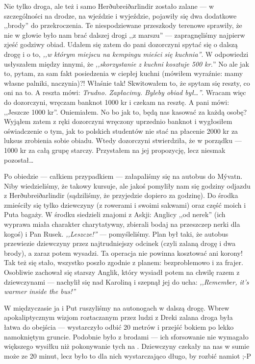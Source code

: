 Nie tylko droga, ale też i samo Herðubreiðarlindir zostało zalane --- w szczególności na drodze, na wjeździe i wyjeździe, pojawiły się dwa dodatkowe ,,brody'' do przekroczenia. Te niespodziewane przeszkody terenowe sprawiły, że nie w głowie było nam brać dalszej drogi ,,z marszu'' --- zapragnęliśmy najpierw zjeść godziwy obiad. Udałem się zatem do pani dozorczyni spytać się o dalszą drogę i o to, \emph{,,w którym miejscu na kempingu mieści się kuchnia''}. W odpowiedzi usłyszałem między innymi, że \emph{,,skorzystanie z kuchni kosztuje 500 kr.}'' No ale jak to, pytam, za sam fakt posiedzenia w ciepłej kuchni (mówiłem wyraźnie: mamy własne palniki, naczynia)?! Właśnie tak! Skwitowałem to, że spytam się reszty, co oni na to. A reszta mówi: \emph{Trudno. Zapłacimy. Byleby obiad był…''}. Wracam więc do dozorczyni, wręczam banknot 1000 kr i czekam na resztę. A pani mówi: ,,Jeszcze 1000 kr''. Oniemiałem. No bo jak to, będą nas kasować za każdą osobę? Wyjąłem zatem z ręki dozorczyni wręczony uprzednio banknot i wygłosiłem oświadczenie o tym, jak to polskich studentów nie stać na płacenie 2000 kr za luksus zrobienia sobie obiadu. Wtedy dozorczyni stwierdziła, że w porządku --- 1000 kr za całą grupę starczy. Przystałem na jej propozycję, lecz niesmak pozostał…

Po obiedzie --- całkiem przypadkiem --- załapaliśmy się na autobus do Mývatn. Niby wiedzieliśmy, że takowy kursuje, ale jakoś pomyliły nam się godziny odjazdu z Herðubreiðarlindir (sądziliśmy, że przyjedzie dopiero za godzinę). Do środka zmieściły się tylko dziewczyny (z rowerami i swoimi sakwami) oraz część moich i Puta bagaży. W środku siedzieli znajomi z Askji: Anglicy ,,od nerek'' (ich wyprawa miała charakter charytatywny, zbierali bodaj na przeszczep nerki dla kogoś) i Pan Rusek. \emph{,,Leszcze!''} --- pomyśleliśmy. Plan był taki, że autobus przewiezie dziewczyny przez najtrudniejszy odcinek (czyli zalaną drogę i dwa brody), a zaraz potem wysadzi. Ta operacja nie powinna kosztować ani korony! Tak też się stało, wszystko poszło zgodnie z planem: bezproblemowo i za frajer. Osobliwie zachował się starszy Anglik, który wysiadł potem na chwilę razem z dziewczynami --- nachylił się nad Karoliną i szepnął jej do ucha: \emph{,,Remember, it’s warmer inside the bus!''}

W międzyczasie ja i Put ruszyliśmy na autonogach w dalszą drogę. Wbrew apokaliptycznym wizjom roztaczanym przez ludzi z Dreki zalana droga była łatwa do obejścia --- wystarczyło odbić 20 metrów i przejść bokiem po lekko namokniętym gruncie. Podobnie było z brodami --- ich sforsowanie nie wymagało większego wysiłku niż pokonywanie tych na . Dziewczyny czekały na nas w sumie może ze 20 minut, lecz było to dla nich wystarczająco długo, by rozbić namiot ;-P

